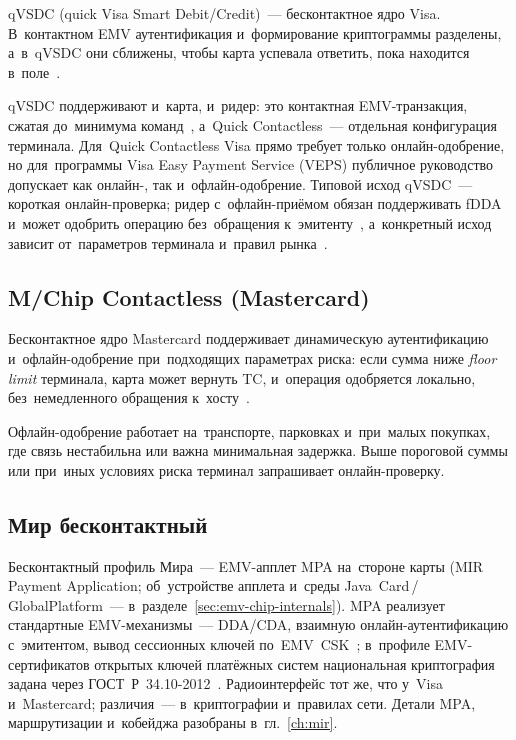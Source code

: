qVSDC (quick Visa Smart Debit\slash Credit)~--- бесконтактное ядро Visa.
В~контактном EMV аутентификация и~формирование криптограммы разделены,
а~в~qVSDC они сближены, чтобы карта успевала ответить, пока находится
в~поле~\cite{visa-core-rules}.

qVSDC поддерживают и~карта, и~ридер: это контактная EMV-транзакция, сжатая
до~минимума команд~\cite{visa-vsdc-guide}, а~Quick Contactless~--- отдельная
конфигурация терминала. Для~Quick Contactless Visa прямо требует только
онлайн-одобрение, но для~программы Visa Easy Payment Service (VEPS) публичное
руководство допускает как онлайн-, так и~офлайн-одобрение. Типовой исход
qVSDC~--- короткая онлайн-проверка; ридер с~офлайн-приёмом обязан поддерживать
fDDA и~может одобрить операцию без~обращения к~эмитенту~\cite{visa-vsdc-guide},
а~конкретный исход зависит от~параметров терминала
и~правил рынка~\cite{visa-quick-chip-emv-qvsdc,visa-tadg}.

\subsection*{M/Chip Contactless (Mastercard)}

Бесконтактное ядро Mastercard поддерживает динамическую аутентификацию
и~офлайн-одобрение при~подходящих параметрах риска: если сумма ниже
\textit{floor limit} терминала, карта может вернуть TC, и~операция одобряется
локально, без~немедленного обращения к~хосту~\cite{emvco-contactless-book-c2}.

Офлайн-одобрение работает на~транспорте, парковках и~при~малых покупках, где
связь нестабильна или важна минимальная задержка. Выше пороговой суммы или
при~иных условиях риска терминал запрашивает онлайн-проверку.

\subsection*{Мир бесконтактный}

Бесконтактный профиль Мира~--- EMV-апплет MPA на~стороне карты (MIR Payment
  Application; об~устройстве апплета и~среды Java~Card\,/\,GlobalPlatform~---
в~разделе~\ref{sec:emv-chip-internals}). MPA реализует стандартные
EMV-механизмы~--- DDA/CDA, взаимную онлайн-аутентификацию с~эмитентом, вывод
сессионных ключей по~EMV~CSK~\cite{ib-bank-mir-security}; в~профиле
EMV-сертификатов открытых ключей платёжных систем национальная криптография
задана через ГОСТ~Р~34.10-2012~\cite{r-1323565-1-015-2018}. Радиоинтерфейс тот
же, что у~Visa и~Mastercard; различия~--- в~криптографии и~правилах сети.
Детали MPA, маршрутизации и~кобейджа разобраны в~гл.~\ref{ch:mir}.

